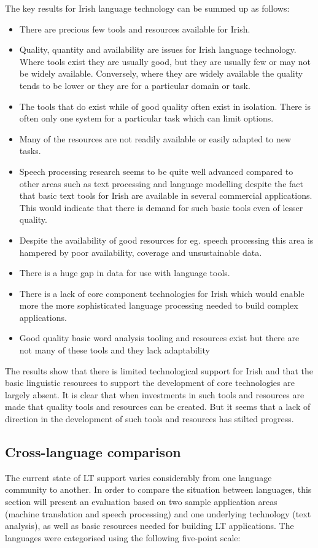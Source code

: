 \documentclass[]{../../metanetpaper}
\begin{document}
\begin{multicols}{2}
The key results for Irish language technology can be summed up as follows:

\begin{itemize}
\item There are precious few tools and resources available for Irish. 
\item Quality, quantity and availability are issues for Irish language technology. Where tools exist they are usually good, but they are usually few or may not be widely available. Conversely, where they are widely available the quality tends to be lower or they are for a particular domain or task. 
\item The tools that do exist while of good quality often exist in isolation. There is often only one system for a particular task which can limit options.
\item Many of the resources are not readily available or easily adapted to new tasks.
\item Speech processing research seems to be quite well advanced compared to other areas such as text processing and language modelling despite the fact that basic text tools for Irish are available in several commercial applications. This would indicate that there is demand for  such basic tools even of lesser quality. 
\item Despite the availability of good resources for eg. speech processing this area is hampered by poor availability, coverage and unsustainable data.
\item There is a huge gap in data for use with language tools.
\item There is a lack of core component technologies for Irish which would enable more the more sophisticated language processing needed to build complex applications.
\item Good quality basic word analysis tooling and resources exist but there are not many of these tools and they lack adaptability
\end{itemize}

The results show that there is limited technological support for Irish and that the basic linguistic resources to support the development of core technologies are largely absent. It is clear that when investments in such tools and resources are made that quality tools and resources can be created. But it seems that a lack of direction in the development of such tools and resources has stilted progress.

\subsection{Cross-language comparison}
The current state of LT support varies considerably from one language community to another. In order to compare the situation between languages, this section will present an evaluation based on two sample application areas (machine translation and speech processing) and one underlying technology (text analysis), as well as basic resources needed for building LT applications. The languages were categorised using the following five-point scale: 


\end{multicols}
\end{document}
